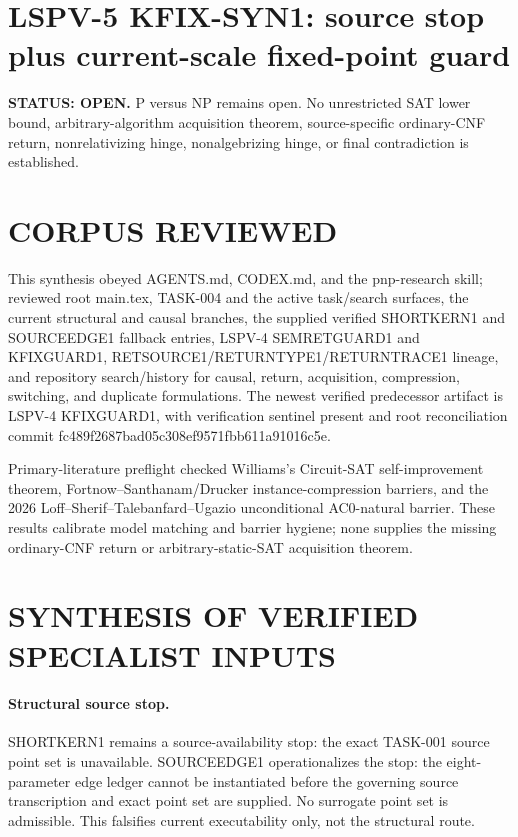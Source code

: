 \documentclass[11pt]{article}
\begin{document}
\section*{LSPV-5 KFIX-SYN1: source stop plus current-scale fixed-point guard}
\textbf{STATUS: OPEN.} P versus NP remains open. No unrestricted SAT lower bound, arbitrary-algorithm acquisition theorem, source-specific ordinary-CNF return, nonrelativizing hinge, nonalgebrizing hinge, or final contradiction is established.

\section*{CORPUS REVIEWED}
This synthesis obeyed AGENTS.md, CODEX.md, and the pnp-research skill; reviewed root main.tex, TASK-004 and the active task/search surfaces, the current structural and causal branches, the supplied verified SHORTKERN1 and SOURCEEDGE1 fallback entries, LSPV-4 SEMRETGUARD1 and KFIXGUARD1, RETSOURCE1/RETURNTYPE1/RETURNTRACE1 lineage, and repository search/history for causal, return, acquisition, compression, switching, and duplicate formulations. The newest verified predecessor artifact is LSPV-4 KFIXGUARD1, with verification sentinel present and root reconciliation commit fc489f2687bad05c308ef9571fbb611a91016c5e.

Primary-literature preflight checked Williams's Circuit-SAT self-improvement theorem, Fortnow--Santhanam/Drucker instance-compression barriers, and the 2026 Loff--Sherif--Talebanfard--Ugazio unconditional AC0-natural barrier. These results calibrate model matching and barrier hygiene; none supplies the missing ordinary-CNF return or arbitrary-static-SAT acquisition theorem.

\section*{SYNTHESIS OF VERIFIED SPECIALIST INPUTS}
\paragraph{Structural source stop.}
SHORTKERN1 remains a source-availability stop: the exact TASK-001 source point set is unavailable. SOURCEEDGE1 operationalizes the stop: the eight-parameter edge ledger cannot be instantiated before the governing source transcription and exact point set are supplied. No surrogate point set is admissible. This falsifies current executability only, not the structural route.
\end{document}
